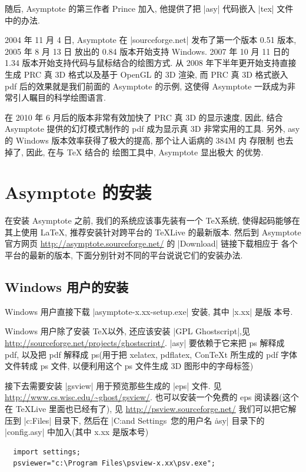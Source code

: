 \documentclass[nofonts,CJKnormalspaces]{ctexbook}
\begin{document}
随后, Asymptote 的第三作者 Prince 加入, 他提供了把 |asy| 代码嵌入
|tex| 文件中的办法.

2004 年 11 月 4 日, Asymptote 在 |sourceforge.net| 发布了第一个版本
0.51 版本, 2005 年 8 月 13 日 放出的 0.84 版本开始支持 Windows. 2007
年 10 月 11 日的 1.34 版本开始支持代码与鼠标结合的绘图方式. 从 2008
年下半年更开始支持直接生成 PRC 真 3D 格式以及基于 OpenGL 的 3D 渲染,
而 PRC 真 3D 格式嵌入 pdf 后的效果就是我们前面的 Asymptote 的示例, 这使得
Asymptote 一跃成为非常引人瞩目的科学绘图语言.

在 2010 年 6 月后的版本非常有效加快了 PRC 真 3D 的显示速度, 因此,
结合 Asymptote 提供的幻灯模式制作的 pdf 成为显示真 3D 非常实用的工具.
另外, asy 的 Windows 版本效率获得了极大的提高, 那个让人诟病的 384M 内
存限制 也去掉了, 因此, 在与 TeX 结合的 绘图工具中, Asymptote 显出极大
的优势.

\section{Asymptote 的安装}
在安装 Asymptote 之前, 我们的系统应该事先装有一个 \TeX 系统,
使得起码能够在其上使用 \LaTeX, 推荐安装针对跨平台的 TeXLive 的最新版本.
然后到 Asymptote官方网页
\url{http://asymptote.sourceforge.net/} 的 |Download| 链接下载相应于
各个平台的最新的版本, 下面分别针对不同的平台说说它们的安装办法.

\subsection{Windows 用户的安装}
Windows 用户直接下载 |asymptote-x.xx-setup.exe| 安装, 其中 |x.xx| 是版
本号.

Windows 用户除了安装 \TeX 以外, 还应该安装 |GPL Ghostscript|,见
\url{http://sourceforge.net/projects/ghostscript/}.
|asy| 要依赖于它来把 ps 解释成 pdf, 以及把 pdf 解释成 ps(用于把 xelatex,
pdflatex, ConTeXt 所生成的 pdf 字体文件转成 ps 文件, 以便利用这个 ps
文件生成 3D 图形中的字母标签)

接下去需要安装 |gsview| 用于预览那些生成的 |eps| 文件.
见 \url{http://www.cs.wisc.edu/~ghost/gsview/}.
也可以安装一个免费的 eps 阅读器(这个在 TeXLive 里面也已经有了), 见
\url{http://psview.sourceforge.net/} 我们可以把它解压到
|c:\Program Files| 目录下, 然后在
|C:\Documents and Settings\ 您的用户名 \.asy|
目录下的 |config.asy| 中加入(其中 x.xx 是版本号)
\begin{lstlisting}
  import settings;
  psviewer="c:\Program Files\psview-x.xx\psv.exe";
\end{lstlisting}
\end{document}
